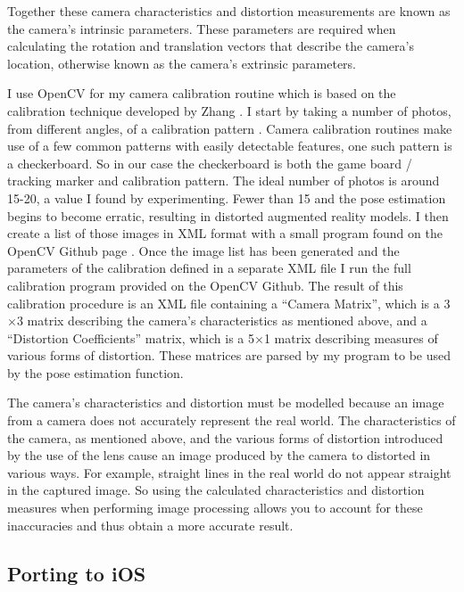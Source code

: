 \documentclass{article}
\begin{document}
Together these camera characteristics and distortion measurements are known as the camera's intrinsic parameters. These parameters are required when calculating the rotation and translation vectors that describe the camera's location, otherwise known as the camera's extrinsic parameters. \par

I use OpenCV for my camera calibration routine which is based on the calibration technique developed by Zhang \cite{zhang}. I start by taking a number of photos, from different angles, of a calibration pattern \cite{calib2}. Camera calibration routines make use of a few common patterns with easily detectable features, one such pattern is a checkerboard. So in our case the checkerboard is both the game board / tracking marker and calibration pattern. The ideal number of photos is around 15-20, a value I found by experimenting. Fewer than 15 and the pose estimation begins to become erratic, resulting in distorted augmented reality models. I then create a list of those images in XML format with a small program found on the OpenCV Github page \cite{opencvGit}. Once the image list has been generated and the parameters of the calibration defined in a separate XML file I run the full calibration program provided on the OpenCV Github. The result of this calibration procedure is an XML file containing a “Camera Matrix”, which is a 3$\times$3 matrix describing the camera's characteristics as mentioned above, and a “Distortion Coefficients” matrix, which is a 5$\times$1 matrix describing measures of various forms of distortion. These matrices are parsed by my program to be used by the pose estimation function. 

The camera's characteristics and distortion must be modelled  because an image from a camera does not accurately represent the real world. The characteristics of the camera, as mentioned above, and the various forms of distortion introduced by the use of the lens cause an image produced by the camera to distorted in various ways. For example, straight lines in the real world do not appear straight in the captured image. So using the calculated characteristics and distortion measures when performing image processing allows you to account for these inaccuracies and thus obtain a more accurate result. 


\subsection{Porting to iOS}
\end{document}
